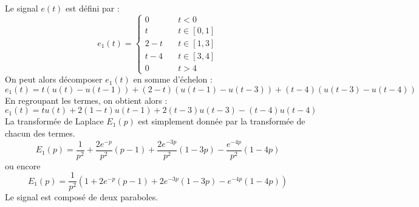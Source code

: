 Le signal $e(t)$ est défini par :
\[
e_1(t)=\begin{cases}
    0&\quad t<0 \\
    t&\quad t\in[0,1]\\
    2-t&\quad t\in[1,3]\\
    t-4&\quad t\in[3,4]\\
    0&\quad t>4
     \end{cases}
\]
On peut alors décomposer $e_1(t)$ en somme d'échelon :
\[
    e_1(t)=t    \left(u(t)-u(t-1)  \right)+(2-t)\left(u(t-1)-u(t-3)\right)+
         (t-4)\left(u(t-3)-u(t-4)\right) 
\]
En regroupant les termes, on obtient alors :
\[
    e_1(t)=tu(t)+2(1-t)u(t-1)+2(t-3)u(t-3)-(t-4)u(t-4)
\]
La transformée de Laplace $E_1(p)$ est simplement donnée par la transformée de
chacun des termes.
\[
    E_1(p)=\dfrac{1}{p^2}+\dfrac{2e^{-p}}{p^2}\left(p-1\right)
                       +\dfrac{2e^{-3p}}{p^2}\left(1-3p\right)
                       -\dfrac{e^{-4p}}{p^2}\left(1-4p\right)
\]
ou encore
\[
    E_1(p)=\dfrac{1}{p^2}
    \left(1+2e^{-p}(p-1)+2e^{-3p}(1-3p)-e^{-4p}(1-4p)\right)
\]
Le signal est composé de deux paraboles. 
